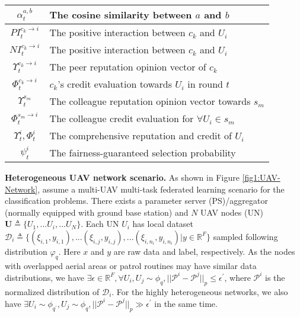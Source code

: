 \documentclass[lettersize,journal]{IEEEtran}
\begin{document}
\begin{table}[!t]
{\begin{tabular}{| c || l |}
    \hline
    $\alpha^{a,b}_{t}$& The cosine similarity between $a$ and $b$\\
    \hline
    $PI^{c_k \rightarrow i}_{t}$ & The positive interaction between $c_k$ and $U_i$\\
    \hline
    $NI^{c_k \rightarrow i}_{t}$& The positive interaction between $c_k$ and $U_i$\\
    \hline
    $\Upsilon^{c_k \rightarrow i}_{t}$& The peer reputation opinion vector of $c_k$\\
    \hline
    $\Phi^{c_k \rightarrow i}_{t}$& $c_k$'s credit evaluation towards $U_i$ in round $t$\\
    \hline
    $\Upsilon^{s_m}_{t}$ & The colleague reputation opinion vector towards $s_m$\\
    \hline
    $\Phi^{s_m \rightarrow i}_{t}$& The colleague credit evaluation for $\forall U_i \in s_m$\\
    \hline
    $\Upsilon^{i}_{t},\Phi^{i}_{t}$& The comprehensive reputation and credit of $U_i$\\
    \hline
    $\psi^{i}_t$& The fairness-guaranteed selection probability\\
    \hline
    \end{tabular}
        }
     \vspace{-1.5em}
     \end{table}
     
\textbf{Heterogeneous UAV network scenario.} 
As shown in Figure \ref{fig1:UAV-Network}, assume a multi-UAV multi-task federated learning scenario for the classification problems. There exists a parameter server (PS)/aggregator (normally equipped with ground base station) and $N$ UAV nodes (UN) $\mathbf{U}\triangleq\{U_1,...U_i,...U_N\}$. Each UN $U_i$ has local dataset $\mathcal{D}_i\triangleq\{(\xi_{i,1},y_{i,1}),...(\xi_{i,j},y_{i,j}),...(\xi_{i,n_i},y_{i,n_i})|y\in \mathbb{R}^F\}$ sampled following distribution $\varphi_q$. %
Here $x$ and $y$ are raw data and label, respectively. As the nodes with overlapped aerial areas or patrol routines may have similar data distributions, we have $\exists \epsilon\in \mathbb{R}^F,\forall U_i, U_j \sim \phi_q, ||\mathcal{P}^i-\mathcal{P}^j||_p \leq \epsilon^{\prime}$, where $\mathcal{P}^i$ is the normalized distribution of $\mathcal{D}_i$. For the highly heterogeneous networks, we also have $\exists U_i \sim \phi_{q^{\prime}}, U_j \sim \phi_q,||\mathcal{P}^i-\mathcal{P}^j||_p \gg \epsilon^{\prime}$ in the same time.  
\end{document}
